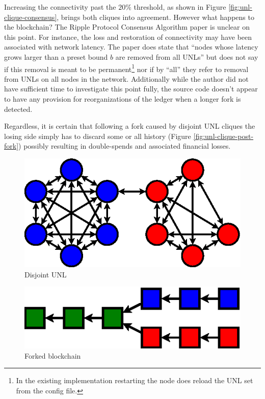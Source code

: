\documentclass{article}
\begin{document}
Increasing the connectivity past the $20\%$ threshold, as shown in Figure
\ref{fig:unl-clique-consensus}, brings both cliques into agreement. However
what happens to the blockchain? The Ripple Protocol Consensus Algorithm paper
is unclear on this point. For instance, the loss and restoration of
connectivity may have been associated with network latency. The paper does
state that ``nodes whose latency grows larger than a preset bound $b$ are
removed from all UNLs''\cite[3.4.1]{ripple-consensus-paper} but does not say if
this removal is meant to be permanent\footnote{In the existing implementation
restarting the node does reload the UNL set from the config file.} nor if by
``all'' they refer to removal from UNLs on all nodes in the network.
Additionally while the author did not have sufficient time to investigate this
point fully, the source code doesn't appear to have any provision for
reorganizations of the ledger when a longer fork is detected.

Regardless, it is certain that following a fork caused by disjoint UNL cliques
the losing side simply has to discard some or all history (Figure
\ref{fig:unl-clique-post-fork}) possibly resulting in double-spends and
associated financial losses.

\begin{figure}
    \centering
    \includegraphics{figures/unl-clique-disjoint.eps}
    \caption{Disjoint UNL}
    \label{fig:unl-clique-disjoint}
\end{figure}

\begin{figure}
    \centering
    \includegraphics{figures/unl-clique-disjoint-blockchain.eps}
    \caption{Forked blockchain}
    \label{fig:unl-clique-disjoint-blockchain}
\end{figure}
\end{document}
